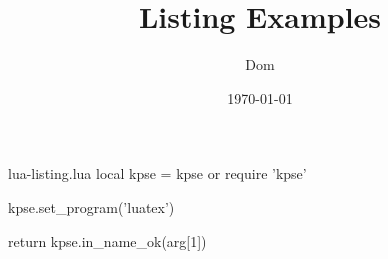\begin{filecontents}[noheader]{lua-listing.lua}
local kpse = kpse or require 'kpse'

kpse.set_program('luatex')

return kpse.in_name_ok(arg[1])
\end{filecontents}
\RequirePackage{luatagging}

\documentclass{article}

\usepackage{listings}

\title{Listing Examples}
\author{Dom}
\date{\today}




    \section{\LaTeX\ code}

    Testing \verb|| with the Lua language.

    Lua}]{lua-listing.lua}

    Testing a \texttt{caption}.

    Lua},caption={The Lua file}]{lua-listing.lua}

    Testing a upper \texttt{caption}.

    Lua},caption={The Lua file},captionpos=b]{lua-listing.lua}


